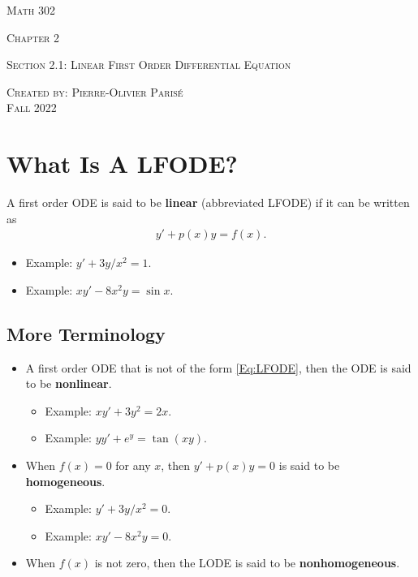 \documentclass[12pt,a4paper]{article}
\begin{document}
\thispagestyle{empty}

\begin{center}
\vspace*{2.5cm}

{\Huge \textsc{Math 302}}

\vspace*{2cm}

{\LARGE \textsc{Chapter 2}} 

\vspace*{0.75cm}

\noindent\textsc{Section 2.1: Linear First Order Differential Equation}

\vspace*{0.75cm}

\tableofcontents

\vfill

\noindent \textsc{Created by: Pierre-Olivier Paris{\'e}} \\
\textsc{Fall 2022}
\end{center}

\newpage

\section{What Is A LFODE?}

A first order ODE is said to be \textbf{linear} (abbreviated LFODE) if it can be written as
	\begin{align}
	y' + p(x) y = f(x) . \label{Eq:LFODE}
	\end{align}
	\begin{itemize}
	\item Example: $y' + 3y/x^2 = 1$.
	\item Example: $xy' - 8x^2 y = \sin x$.
	\end{itemize}
\vspace*{10pt}

\subsection{More Terminology}
\begin{itemize}
\item A first order ODE that is not of the form \eqref{Eq:LFODE}, then the ODE is said to be \textbf{nonlinear}.
	\begin{itemize}
	\item Example: $xy' + 3y^2 = 2x$.
	\item Example: $yy' + e^y = \tan (xy)$.
	\end{itemize}
\item When $f (x) = 0$ for any $x$, then $y' + p(x) y = 0$ is said to be \textbf{homogeneous}.
	\begin{itemize}
	\item Example: $y' + 3y/x^2 = 0$.
	\item Example: $xy' - 8x^2 y = 0$.
	\end{itemize}
\item When $f(x)$ is not zero, then the LODE is said to be \textbf{nonhomogeneous}.
\end{itemize}
\end{document}
